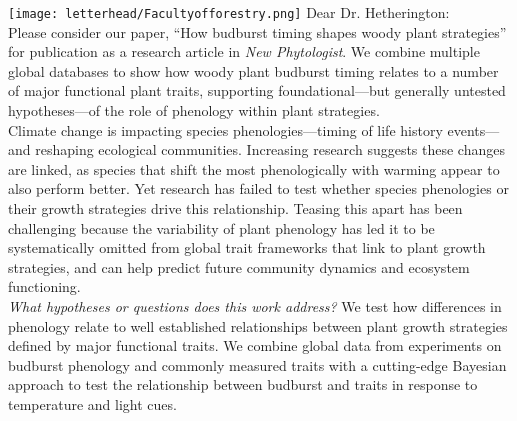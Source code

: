\documentclass[11pt,a4paper]{article}
\begin{document}
\noindent \texttt{[image: letterhead/Facultyofforestry.png]}
\noindent Dear Dr. Hetherington:
\vspace{1.5ex}\\
\noindent Please consider our paper, ``How budburst timing shapes woody plant strategies'' for publication as a research article in \emph{New Phytologist}. We combine multiple global databases to show how woody plant budburst timing relates to a number of major functional plant traits, supporting foundational---but generally untested hypotheses---of the role of phenology within plant strategies. %
\vspace{1.5ex}\\ 
\noindent Climate change is impacting species phenologies---timing of life history events---and reshaping ecological communities. Increasing research suggests these changes are linked, as species that shift the most phenologically with warming appear to also perform better. Yet research has failed to test whether species phenologies or their growth strategies drive this relationship. Teasing this apart has been challenging because the variability of plant phenology has led it to be systematically omitted from global trait frameworks that link to plant growth strategies, and can help predict future community dynamics and ecosystem functioning. %
\vspace{1.5ex}\\
\emph{What hypotheses or questions does this work address?} We test how differences in phenology relate to well established relationships between plant growth strategies defined by major functional traits. We combine global data from experiments on budburst phenology and commonly measured traits with a cutting-edge Bayesian approach to test the relationship between budburst and traits in response to temperature and light cues.  %
\vspace{1.5ex}\\
\end{document}
